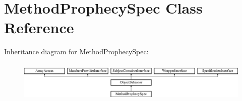 \section{Method\+Prophecy\+Spec Class Reference}
\label{classspec_1_1_prophecy_1_1_prophecy_1_1_method_prophecy_spec}
Inheritance diagram for Method\+Prophecy\+Spec\+:\begin{figure}[H]
\begin{center}
\leavevmode
\includegraphics[height=1.953488cm]{classspec_1_1_prophecy_1_1_prophecy_1_1_method_prophecy_spec}
\end{center}
\end{figure}
